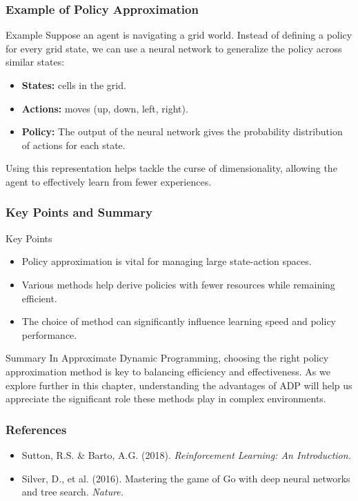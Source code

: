 \documentclass[aspectratio=169]{beamer}
\begin{document}
\begin{frame}[fragile]
    \frametitle{Example of Policy Approximation}
    \begin{block}{Example}
        Suppose an agent is navigating a grid world. Instead of defining a policy for every grid state, we can use a neural network to generalize the policy across similar states:
        \begin{itemize}
            \item \textbf{States:} cells in the grid.
            \item \textbf{Actions:} moves (up, down, left, right).
            \item \textbf{Policy:} The output of the neural network gives the probability distribution of actions for each state.
        \end{itemize}
        Using this representation helps tackle the curse of dimensionality, allowing the agent to effectively learn from fewer experiences.
    \end{block}
\end{frame}

\begin{frame}[fragile]
    \frametitle{Key Points and Summary}
    \begin{block}{Key Points}
        \begin{itemize}
            \item Policy approximation is vital for managing large state-action spaces.
            \item Various methods help derive policies with fewer resources while remaining efficient.
            \item The choice of method can significantly influence learning speed and policy performance.
        \end{itemize}
    \end{block}
    
    \begin{block}{Summary}
        In Approximate Dynamic Programming, choosing the right policy approximation method is key to balancing efficiency and effectiveness. As we explore further in this chapter, understanding the advantages of ADP will help us appreciate the significant role these methods play in complex environments.
    \end{block}
\end{frame}

\begin{frame}[fragile]
    \frametitle{References}
    \begin{itemize}
        \item Sutton, R.S. \& Barto, A.G. (2018). \textit{Reinforcement Learning: An Introduction.}
        \item Silver, D., et al. (2016). Mastering the game of Go with deep neural networks and tree search. \textit{Nature.}
    \end{itemize}
\end{frame}
\end{document}
